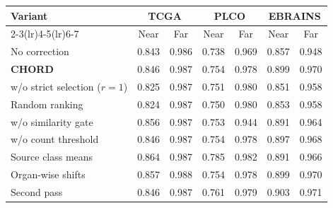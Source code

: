 \begin{tabular}{lcccccc}
\toprule
Variant & \multicolumn{2}{c}{TCGA} & \multicolumn{2}{c}{PLCO} & \multicolumn{2}{c}{EBRAINS} \\
\cmidrule(lr){2-3}\cmidrule(lr){4-5}\cmidrule(lr){6-7}
 & Near & Far & Near & Far & Near & Far \\
\midrule
No correction & 0.843 & 0.986 & 0.738 & 0.969 & 0.857 & 0.948 \\
\textbf{CHORD} & 0.846 & 0.987 & 0.754 & 0.978 & 0.899 & 0.970 \\
\midrule
w/o strict selection ($r=1$) & 0.825 & 0.987 & 0.751 & 0.980 & 0.851 & 0.958 \\
Random ranking & 0.824 & 0.987 & 0.750 & 0.980 & 0.853 & 0.958 \\
w/o similarity gate & 0.856 & 0.987 & 0.753 & 0.944 & 0.891 & 0.964 \\
w/o count threshold & 0.846 & 0.987 & 0.754 & 0.978 & 0.897 & 0.968 \\
\midrule
Source class means & 0.864 & 0.987 & 0.785 & 0.982 & 0.891 & 0.966 \\
Organ-wise shifts & 0.857 & 0.988 & 0.754 & 0.978 & 0.899 & 0.970 \\
Second pass & 0.846 & 0.987 & 0.761 & 0.979 & 0.903 & 0.971 \\
\bottomrule
\end{tabular}
